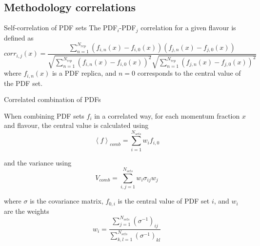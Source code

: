 \author[Roy Stegeman]{}
\subsection{Methodology correlations}

\begin{frame}[t]{Self-correlation of PDF sets}
The PDF$_i$-PDF$_j$ correlation for a given flavour is defined as
$$corr_{i,j}(x)= \frac{\sum_{n=1}^{N_{rep}} (f_{i,n}(x) -  f_{i,0}(x) )(f_{j,n}(x) -  f_{j,0}(x)) }{\sqrt{\sum_{n=1}^{N_{rep}}(f_{i,n}(x) - f_{i,0}(x))^2} \sqrt{\sum_{n=1}^{N_{rep}}(f_{j,n}(x) -  f_{j,0}(x))^2}}$$
where $f_{i,n}(x)$ is a PDF replica, and $n=0$ corresponds to the central value of the PDF set. 

\end{frame}

\begin{frame}[t]{Correlated combination of PDFs}

When combining PDF sets $f_i$ in a correlated way, for each momentum fraction $x$ and flavour, the central value is calculated using
$$
\left\langle f\right\rangle_{comb}=\sum_{i=1}^{N_{sets}} w_{i} f_{i,0}
$$

and the variance using
$$
V_{comb}=\sum_{i, j=1}^{N_{sets}} w_{i} \sigma_{i j} w_{j}
$$

where $\sigma$ is the covariance matrix, $f_{0,i}$ is the central value of PDF set $i$, and $w_i$ are the weights 
$$
w_{i}=\frac{\sum_{j=1}^{N_{sets}}\left(\sigma^{-1}\right)_{i j}}{\sum_{k, l=1}^{N_{sets}}\left(\sigma^{-1}\right)_{k l}}
$$

\end{frame}